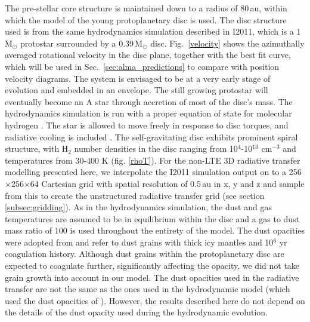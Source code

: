 \documentclass[useAMS,usenatbib]{mn2e}
\begin{document}
The pre-stellar core structure is maintained down to a radius of 80\,au, within which the model of the young protoplanetary disc is used. The disc structure used is from the same hydrodynamics simulation described in I2011, which is a 1$\,$M$_\odot$ protostar surrounded by a 0.39$\,$M$_\odot$ disc. Fig.~\ref{velocity} shows the azimuthally averaged rotational velocity in the disc plane, together with the best fit curve, which will be used in Sec.~\ref{sec:alma_predictions} to compare with position velocity diagrams. The system is envisaged to be at a very early stage of evolution and embedded in an envelope.  The still growing protostar will eventually become an A star through accretion of most of the disc's mass. The hydrodynamics simulation is run with a proper equation of state for molecular hydrogen \citep{Boley2007}.  The star is allowed to move freely in response to disc torques, and radiative cooling is included \citep{Boley2009}. The self-gravitating disc exhibits prominent spiral structure, with H$_2$ number densities in the disc ranging from 10$^4$-10$^{13}$ cm$^{-3}$ and temperatures from 30-400 K (fig. \ref{rhoT}). For the non-LTE 3D radiative transfer modelling presented here, we interpolate the I2011 simulation output on to a 256$\times$256$\times$64 Cartesian grid with spatial resolution of 0.5$\,$au in x, y and z and sample from this to create the unstructured radiative transfer grid (see section \ref{subsec:gridding}).  As in the hydrodynamics simulation, the dust and gas temperatures are assumed to be in equilibrium within the disc and a gas to dust mass ratio of 100 is used throughout the entirety of the model. The dust opacities were adopted from \citet{Ossenkopf1994} and refer to dust grains with thick icy mantles and 10$^6$ yr coagulation history.  Although dust grains within the protoplanetary disc are expected to coagulate further,  significantly affecting the opacity, we did not take grain growth into account in our model.  The dust opacities used in the radiative transfer are not the same as the ones used in the hydrodynamic model (which used the dust opacities of \citealt{DAlessio2001}). However, the results described here do not depend on the details of the dust opacity used during the hydrodynamic evolution.\smallskip
\end{document}
